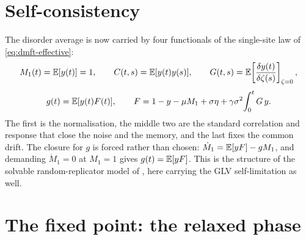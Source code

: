 \section{Self-consistency}
\label{sec:dmft-selfconsistency}

The disorder average is now carried by four functionals of the single-site law of
\eqref{eq:dmft-effective}:
\begin{equation}
    M_1(t) = \mathbb{E}[y(t)] = 1,\qquad
    C(t,s) = \mathbb{E}[y(t)y(s)],\qquad
    G(t,s) = \mathbb{E}\!\left[\frac{\delta y(t)}{\delta\zeta(s)}\right]_{\zeta=0},
\end{equation}
\begin{equation}
    g(t) = \mathbb{E}[y(t)F(t)],\qquad
    F = 1 - y - \mu M_1 + \sigma\eta + \gamma\sigma^2\!\int_0^t G\,y .
    \label{eq:dmft-closures}
\end{equation}
The first is the normalisation, the middle two are the standard correlation and response
that close the noise and the memory, and the last fixes the common drift. The closure for
$g$ is forced rather than chosen: $\dot M_1 = \mathbb{E}[yF] - g M_1$, and demanding $\dot M_1 = 0$
at $M_1 = 1$ gives $g(t) = \mathbb{E}[yF]$. This is the structure of the solvable random-replicator
model of \citet{diederich1989}, here carrying the GLV self-limitation as well.

\section{The fixed point: the relaxed phase}
\label{sec:dmft-fixedpoint}

